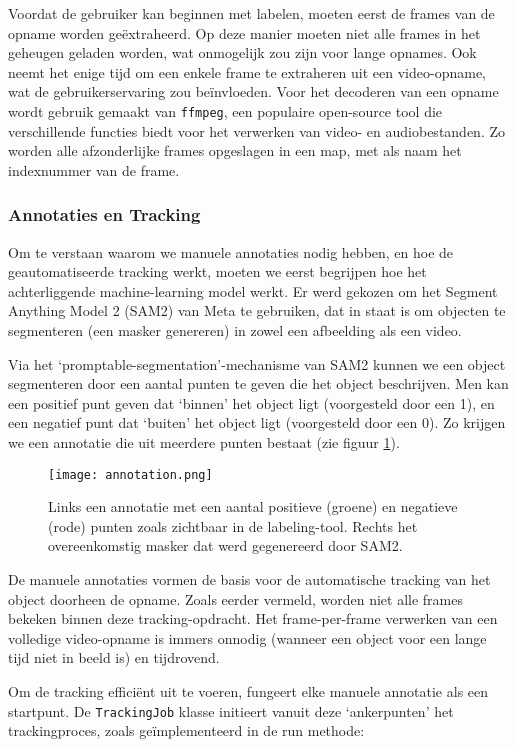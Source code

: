 Voordat de gebruiker kan beginnen met labelen, moeten eerst de frames van de opname worden geëxtraheerd.
Op deze manier moeten niet alle frames in het geheugen geladen worden, wat onmogelijk zou zijn voor lange opnames.
Ook neemt het enige tijd om een enkele frame te extraheren uit een video-opname, wat de gebruikerservaring zou beïnvloeden.
Voor het decoderen van een opname wordt gebruik gemaakt van \texttt{ffmpeg}, een populaire open-source tool die verschillende 
functies biedt voor het verwerken van video- en audiobestanden.
Zo worden alle afzonderlijke frames opgeslagen in een map, met als naam het indexnummer van de frame.

\subsubsection{Annotaties en Tracking}

Om te verstaan waarom we manuele annotaties nodig hebben, en hoe de geautomatiseerde tracking werkt, moeten we eerst begrijpen hoe het achterliggende machine-learning model werkt.
Er werd gekozen om het Segment Anything Model 2 (SAM2) van Meta te gebruiken, dat in staat is om objecten te segmenteren (een masker genereren) in zowel een afbeelding als een video.

Via het `promptable-segmentation'-mechanisme van SAM2 kunnen we een object segmenteren door een aantal punten te geven die het object beschrijven.
Men kan een positief punt geven dat `binnen' het object ligt (voorgesteld door een 1), en een negatief punt dat `buiten' het object ligt (voorgesteld door een 0).
Zo krijgen we een annotatie die uit meerdere punten bestaat (zie figuur \ref{fig:annotation}).

\begin{figure}[H]
  \centering
  \texttt{[image: annotation.png]}
  \caption[]{\label{fig:annotation} Links een annotatie met een aantal positieve (groene) en negatieve (rode) punten zoals zichtbaar in de labeling-tool. Rechts het overeenkomstig masker dat werd gegenereerd door SAM2. }
\end{figure}

De manuele annotaties vormen de basis voor de automatische tracking van het object doorheen de opname.
Zoals eerder vermeld, worden niet alle frames bekeken binnen deze tracking-opdracht.
Het frame-per-frame verwerken van een volledige video-opname is immers onnodig (wanneer een object voor een lange tijd niet in beeld is) en tijdrovend.

Om de tracking efficiënt uit te voeren, fungeert elke manuele annotatie als een startpunt. 
De \texttt{TrackingJob} klasse initieert vanuit deze `ankerpunten' het trackingproces, zoals geïmplementeerd in de run methode:

